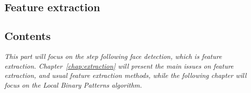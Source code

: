   \begin{titlepage}
    \vspace*{\fill}
      \part{Feature extraction}
    \vspace*{\fill}
  \end{titlepage}

\startcontents[parts]

\chapter*{Contents}

\textit{This part will focus on the step following face detection, which is feature extraction. Chapter~\ref{chap:extraction} will present the main issues on feature extraction, and usual feature extraction methods, while the following chapter will focus on the Local Binary Patterns algorithm.} 

\vspace{\baselineskip}


\pagebreak

\newpage


\stopcontents[parts]



